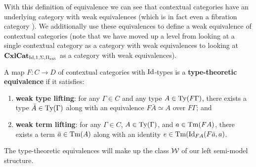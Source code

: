 \documentclass{amsart}
\begin{document}
With this definition of equivalence we can see that contextual categories have an underlying category with weak equivalences (which is in fact even a fibration category \cite[Thm. 3.2.5]{AKL}). We additionally use these equivalences to define a weak equivalence of contextual categories (note that we have moved up a level from looking at a single contextual category as a category with weak equivalences to looking at $\operatorname{\mathbf{CxlCat}}_{\operatorname{Id},1,\Sigma,\Pi_{\operatorname{ext}}}$ as a category with weak equivalences).
\begin{defn}
    A map $F\colon C\to D$ of contextual categories with $\operatorname{Id}$-types is a \textbf{type-theoretic equivalence} if it satisfies:
    \begin{enumerate}
        \item \textbf{weak type lifting}: for any $\Gamma\in C$ and any type $A\in\operatorname{Ty}(F\Gamma)$, there exists a type $\bar{A}\in\operatorname{Ty}(\Gamma)$ along with an equivalence $F\bar{A}\simeq A$ over $F\Gamma$; and
        \item \textbf{weak term lifting}: for any $\Gamma\in C$, $A\in\operatorname{Ty}(\Gamma)$, and $a\in\operatorname{Tm}(FA)$, there exists a term $\bar{a}\in\operatorname{Tm}(A)$ along with an identity $e\in\operatorname{Tm}(\operatorname{Id}_{FA}(F\bar{a},a)$.
    \end{enumerate}
\end{defn}
The type-theoretic equivalences will make up the class $\mathcal{W}$ of our left semi-model structure.
\end{document}
